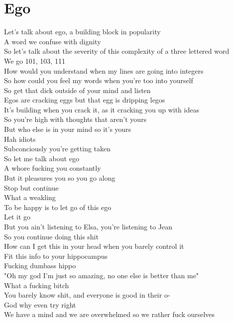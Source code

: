 \documentclass[12pt, b5paper, oneside]{book}
\begin{document}
\section{Ego}
Let's talk about ego, a building block in popularity 
\\A word we confuse with dignity 
\\So let's talk about the severity of this complexity of a three lettered word 
\\We go 101, 103, 111
\\How would you understand when my lines are going into integers 
\\So how could you feel my words when you're too into yourself 
\\So get that dick outside of your mind and listen 
\\Egos are cracking eggs but that egg is dripping legos 
\\It's building when you crack it, as it cracking you up with ideas 
\\So you're high with thoughts that aren't yours 
\\But who else is in your mind so it's yours 
\\Hah idiots 
\\Subconciously you're getting taken 
\\So let me talk about ego 
\\A whore fucking you constantly 
\\But it pleasures you so you go along 
\\Stop but continue
\\What a weakling 
\\To be happy is to let go of this ego
\\Let it go 
\\But you ain't listening to Elsa, you're listening to Jean 
\\So you continue doing this shit 
\\How can I get this in your head when you barely control it 
\\Fit this info to your hippocampus 
\\Fucking dumbass hippo
\\"Oh my god I'm just so amazing, no one else is better than me"
\\What a fucking bitch 
\\You barely know shit, and everyone is good in their o-
\\God why even try right 
\\We have a mind and we are overwhelmed so we rather fuck ourselves 
\end{document}
